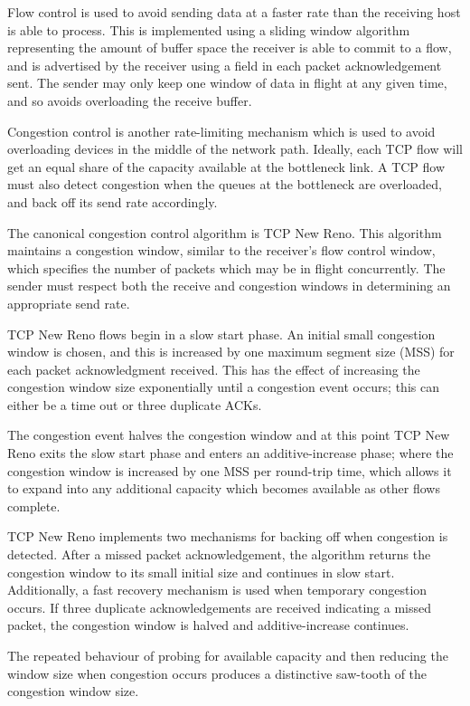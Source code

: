 Flow control is used to avoid sending data at a faster rate than the receiving
host is able to process. This is implemented using a sliding window algorithm
representing the amount of buffer space the receiver is able to commit to a
flow, and is advertised by the receiver using a field in each packet
acknowledgement sent. The sender may only keep one window of data in flight at
any given time, and so avoids overloading the receive buffer.

Congestion control is another rate-limiting mechanism which is used to avoid
overloading devices in the middle of the network path. Ideally, each TCP flow
will get an equal share of the capacity available at the bottleneck link. A TCP
flow must also detect congestion when the queues at the bottleneck are
overloaded, and back off its send rate accordingly.

The canonical congestion control algorithm is TCP New Reno. This algorithm
maintains a congestion window, similar to the receiver's flow control window,
which specifies the number of packets which may be in flight concurrently. The
sender must respect both the receive and congestion windows in determining an
appropriate send rate.

TCP New Reno flows begin in a slow start phase. An initial small congestion
window is chosen, and this is increased by one maximum segment size (MSS) for  %
each packet acknowledgment received. This has the effect of increasing the
congestion window size exponentially until a congestion event occurs; this can
either be a time out or three duplicate ACKs.


The congestion event halves the congestion window and at this point TCP New Reno
exits the slow start phase and enters an additive-increase phase; where the
congestion window is increased by one MSS per round-trip time, which allows it
to expand into any additional capacity which becomes available as other flows
complete.

TCP New Reno implements two mechanisms for backing off when congestion is
detected. After a missed packet acknowledgement, the algorithm returns the
congestion window to its small initial size and continues in slow start.
Additionally, a fast recovery mechanism is used when temporary congestion
occurs. If three duplicate acknowledgements are received indicating a missed
packet, the congestion window is halved and additive-increase continues.

The repeated behaviour of probing for available capacity and then reducing the
window size when congestion occurs produces a distinctive saw-tooth of the
congestion window size.

